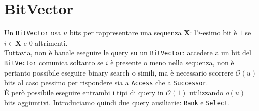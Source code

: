 \documentclass{article}
\newcommand{\X}{\mathbf{X}}
\newcommand{\ttt}{\texttt}
\newcommand*{\OO}{\ensuremath{\mathcal{O}}}
\begin{document}
\section{BitVector}

Un \ttt{BitVector} usa $u$ bits per rappresentare una sequenza $\X$: l'$i$-esimo bit \`e $1$ se $i \in \X$ e $0$ altrimenti. \\
Tuttavia, non \`e banale eseguire le query su un \ttt{BitVector}: accedere a un bit del \ttt{BitVector} comunica soltanto se $i$ \`e presente o meno nella sequenza, non \`e pertanto possibile eseguire binary search o simili, ma \`e necessario scorrere $\OO(u)$ bits al caso pessimo per rispondere sia a \ttt{Access} che a \ttt{Successor}.\\
\`E per\`o possibile eseguire entrambi i tipi di query in $\OO(1)$ utilizzando $o(u)$ bits aggiuntivi. Introduciamo quindi due query ausiliarie: \ttt{Rank} e \ttt{Select}.
\end{document}
